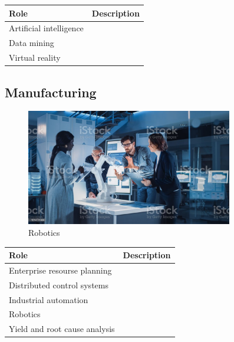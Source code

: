 \begin{table}[H]
	\begin{center}
		\begin{tabular}{p{1.3in}|p{3in}} 
			\textbf{Role} & \textbf{Description}\\
			\hline
			Artificial intelligence & \\
			\hline
			Data mining & \\
			\hline
			Virtual reality & \\
		\end{tabular}
	\end{center}
\end{table}

\subsection{Manufacturing}

\begin{figure}[H]
	\begin{center}
		\caption{Robotics}
		\vskip 4pt
		\includegraphics[height=2in]{images/careers/istockphoto-1214111404-1024x1024.jpg}
	\end{center}
\end{figure}

\begin{table}[H]
	\begin{center}
		\begin{tabular}{p{1.3in}|p{3in}} 
			\textbf{Role} & \textbf{Description}\\
			\hline
			Enterprise resourse planning & \\
			\hline
			Distributed control systems & \\
			\hline
			Industrial automation & \\
			\hline
			Robotics & \\
			\hline
			Yield and root cause analysis & \\
		\end{tabular}
	\end{center}
\end{table}


